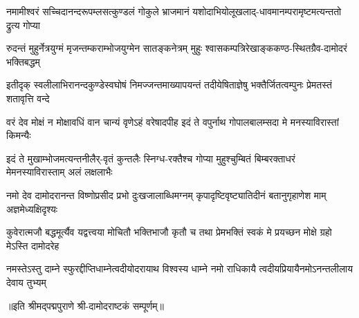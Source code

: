 
\fourlineindentedshloka
{नमामीश्वरं सच्चिदानन्दरूपम्}{लसत्कुण्डलं गोकुले भ्राजमानं}
{यशोदाभियोलूखलाद्-धावमानम्}{परामृष्टमत्यन्ततो द्रुत्य गोप्या}

\fourlineindentedshloka
{रुदन्तं मुहुर्नेत्रयुग्मं मृजन्तम्}{कराम्भोजयुग्मेन सातङ्कनेत्रम्}
{मुहुः श्वासकम्पत्रिरेखाङ्ककण्ठ-}{स्थितग्रैव-दामोदरं भक्तिबद्धम्}

\fourlineindentedshloka
{इतीदृक् स्वलीलाभिरानन्दकुण्डे}{स्वघोषं निमज्जन्तमाख्यापयन्तं}
{तदीयेषिताज्ञेषु भक्तैर्जितत्वम्}{पुनः प्रेमतस्तं शतावृत्ति वन्दे}

\fourlineindentedshloka
{वरं देव मोक्षं न मोक्षावधिं वा}{न चान्यं वृणेऽहं वरेषादपीह}
{इदं ते वपुर्नाथ गोपालबालम्}{सदा मे मनस्याविरास्तां किमन्यैः}

\fourlineindentedshloka
{इदं ते मुखाम्भोजमत्यन्तनीलैर्-}{वृतं कुन्तलैः स्निग्ध-रक्तैश्च गोप्या}
{मुहुश्चुम्बितं बिम्बरक्ताधरं मे}{मनस्याविरास्ताम् अलं लक्षलाभैः}

\fourlineindentedshloka
{नमो देव दामोदरानन्त विष्णो}{प्रसीद प्रभो दुःखजालाब्धिमग्नम्}
{कृपादृष्टिवृष्ट्यातिदीनं बतानु}{गृहाणेश माम् अज्ञमेध्यक्षिदृश्यः}

\fourlineindentedshloka
{कुवेरात्मजौ बद्धमूर्त्यैव यद्वत्}{त्वया मोचितौ भक्तिभाजौ कृतौ च}
{तथा प्रेमभक्तिं स्वकं मे प्रयच्छ}{न मोक्षे ग्रहो मेऽस्ति दामोदरेह}

\fourlineindentedshloka
{नमस्तेऽस्तु दाम्ने स्फुरद्दीप्तिधाम्ने}{त्वदीयोदरायाथ विश्वस्य धाम्ने}
{नमो राधिकायै त्वदीयप्रियायै}{नमोऽनन्तलीलाय देवाय तुभ्यम्}

॥इति श्रीमद्पद्मपुराणे श्री-दामोदराष्टकं सम्पूर्णम्॥